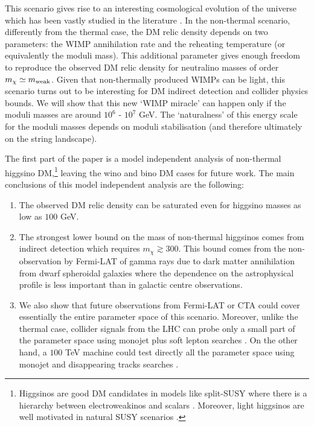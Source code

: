 \documentclass[11pt,a4paper]{article}
\begin{document}
This scenario gives rise to an interesting cosmological evolution of the universe which has been vastly studied in the literature \cite{McDonald:1989jd,Chung,Moroi:1999zb,Giudice:2000ex,kamionkowski-turner,Moroi,Drees,Khalil,Fornengo:2002db,Pallis:2004yy,endo,kohri,Gelmini:2006pw,Gelmini:2006pq,dutta,Acharya:2009zt,Arcadi:2011ev,Fan:2013faa,Blinov:2014nla,Kane:2015jia}. In the non-thermal scenario, differently from the thermal case, the DM relic density depends on two parameters: the WIMP annihilation rate and the reheating temperature (or equivalently the moduli mass). This additional parameter gives enough freedom to reproduce the observed DM relic density for neutralino masses of order $m_\chi \simeq m_{\rm weak}$. Given that non-thermally produced WIMPs can be light, this scenario turns out to be interesting for DM indirect detection and collider physics bounds. We will show that this new ‘WIMP miracle’ can happen only if the moduli masses are around $10^6$ - $10^7$ GeV. The ‘naturalness’ of this energy scale for the moduli masses depends on moduli stabilisation (and therefore ultimately on the string landscape).

The first part of the paper is a model independent analysis of non-thermal higgsino DM,\footnote{Higgsinos are good DM candidates in models like split-SUSY where there is a hierarchy between electroweakinos and scalars \cite{Wells:2003tf}. Moreover, light higgsinos are well motivated in natural SUSY scenarios \cite{Hall:2011aa}.} leaving the wino and bino DM cases for future work. The main conclusions of this model independent analysis are the following:
\begin{enumerate}
\item The observed DM relic density can be saturated even for higgsino masses as low as $100$ GeV.

\item The strongest lower bound on the mass of non-thermal higgsinos comes from indirect detection which requires $m_\chi \gtrsim 300$. This bound comes from the non-observation by Fermi-LAT \cite{Ackermann:2015zua} of gamma rays due to dark matter annihilation from dwarf spheroidal galaxies where the dependence on the astrophysical profile is less important than in galactic centre observations.

\item We also show that future observations from Fermi-LAT or CTA \cite{Carr:2015hta} could cover essentially the entire parameter space of this scenario. Moreover, unlike the thermal case, collider signals from the LHC can probe only a small part of the parameter space using monojet plus soft lepton searches \cite{Baer:2014kya}. On the other hand, a $100$ TeV machine could test directly all the parameter space using monojet and disappearing tracks searches \cite{Low:2014cba}.
\end{enumerate}
\end{document}
